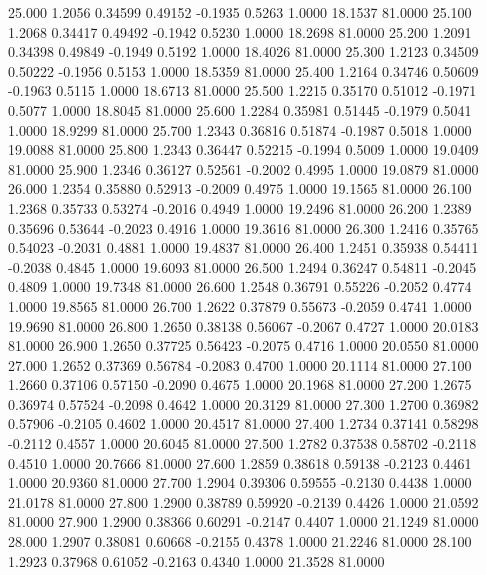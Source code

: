   25.000   1.2056   0.34599   0.49152  -0.1935   0.5263   1.0000  18.1537  81.0000
  25.100   1.2068   0.34417   0.49492  -0.1942   0.5230   1.0000  18.2698  81.0000
  25.200   1.2091   0.34398   0.49849  -0.1949   0.5192   1.0000  18.4026  81.0000
  25.300   1.2123   0.34509   0.50222  -0.1956   0.5153   1.0000  18.5359  81.0000
  25.400   1.2164   0.34746   0.50609  -0.1963   0.5115   1.0000  18.6713  81.0000
  25.500   1.2215   0.35170   0.51012  -0.1971   0.5077   1.0000  18.8045  81.0000
  25.600   1.2284   0.35981   0.51445  -0.1979   0.5041   1.0000  18.9299  81.0000
  25.700   1.2343   0.36816   0.51874  -0.1987   0.5018   1.0000  19.0088  81.0000
  25.800   1.2343   0.36447   0.52215  -0.1994   0.5009   1.0000  19.0409  81.0000
  25.900   1.2346   0.36127   0.52561  -0.2002   0.4995   1.0000  19.0879  81.0000
  26.000   1.2354   0.35880   0.52913  -0.2009   0.4975   1.0000  19.1565  81.0000
  26.100   1.2368   0.35733   0.53274  -0.2016   0.4949   1.0000  19.2496  81.0000
  26.200   1.2389   0.35696   0.53644  -0.2023   0.4916   1.0000  19.3616  81.0000
  26.300   1.2416   0.35765   0.54023  -0.2031   0.4881   1.0000  19.4837  81.0000
  26.400   1.2451   0.35938   0.54411  -0.2038   0.4845   1.0000  19.6093  81.0000
  26.500   1.2494   0.36247   0.54811  -0.2045   0.4809   1.0000  19.7348  81.0000
  26.600   1.2548   0.36791   0.55226  -0.2052   0.4774   1.0000  19.8565  81.0000
  26.700   1.2622   0.37879   0.55673  -0.2059   0.4741   1.0000  19.9690  81.0000
  26.800   1.2650   0.38138   0.56067  -0.2067   0.4727   1.0000  20.0183  81.0000
  26.900   1.2650   0.37725   0.56423  -0.2075   0.4716   1.0000  20.0550  81.0000
  27.000   1.2652   0.37369   0.56784  -0.2083   0.4700   1.0000  20.1114  81.0000
  27.100   1.2660   0.37106   0.57150  -0.2090   0.4675   1.0000  20.1968  81.0000
  27.200   1.2675   0.36974   0.57524  -0.2098   0.4642   1.0000  20.3129  81.0000
  27.300   1.2700   0.36982   0.57906  -0.2105   0.4602   1.0000  20.4517  81.0000
  27.400   1.2734   0.37141   0.58298  -0.2112   0.4557   1.0000  20.6045  81.0000
  27.500   1.2782   0.37538   0.58702  -0.2118   0.4510   1.0000  20.7666  81.0000
  27.600   1.2859   0.38618   0.59138  -0.2123   0.4461   1.0000  20.9360  81.0000
  27.700   1.2904   0.39306   0.59555  -0.2130   0.4438   1.0000  21.0178  81.0000
  27.800   1.2900   0.38789   0.59920  -0.2139   0.4426   1.0000  21.0592  81.0000
  27.900   1.2900   0.38366   0.60291  -0.2147   0.4407   1.0000  21.1249  81.0000
  28.000   1.2907   0.38081   0.60668  -0.2155   0.4378   1.0000  21.2246  81.0000
  28.100   1.2923   0.37968   0.61052  -0.2163   0.4340   1.0000  21.3528  81.0000
